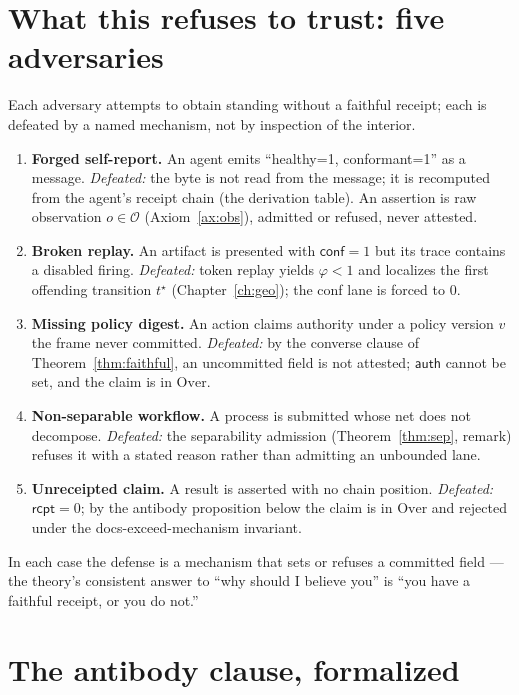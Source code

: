 \documentclass[11pt,oneside]{book}
\theoremstyle{definition}
\theoremstyle{plain}
\theoremstyle{remark}
\newcommand{\Obs}{\mathcal{O}}                 %
\newcommand{\Fitness}{\varphi}
\begin{document}
\section{What this refuses to trust: five adversaries}

Each adversary attempts to obtain standing without a faithful receipt; each is defeated by a
named mechanism, not by inspection of the interior.
\begin{enumerate}[leftmargin=1.6em,itemsep=2pt]
\item \textbf{Forged self-report.} An agent emits ``\textsf{healthy}=1, \textsf{conformant}=1''
      as a message. \emph{Defeated:} the byte is not read from the message; it is recomputed
      from the agent's receipt chain (the derivation table). An assertion is raw observation
      $o\in\Obs$ (Axiom~\ref{ax:obs}), admitted or refused, never attested.
\item \textbf{Broken replay.} An artifact is presented with $\textsf{conf}=1$ but its trace
      contains a disabled firing. \emph{Defeated:} token replay yields $\Fitness<1$ and
      localizes the first offending transition $t^\star$ (Chapter~\ref{ch:geo}); the
      \textsf{conf} lane is forced to $0$.
\item \textbf{Missing policy digest.} An action claims authority under a policy version $v$ the
      frame never committed. \emph{Defeated:} by the converse clause of
      Theorem~\ref{thm:faithful}, an uncommitted field is not attested; $\textsf{auth}$ cannot
      be set, and the claim is in $\mathrm{Over}$.
\item \textbf{Non-separable workflow.} A process is submitted whose net does not decompose.
      \emph{Defeated:} the separability admission (Theorem~\ref{thm:sep}, remark) refuses it
      with a stated reason rather than admitting an unbounded lane.
\item \textbf{Unreceipted claim.} A result is asserted with no chain position.
      \emph{Defeated:} $\textsf{rcpt}=0$; by the antibody proposition below the claim is in
      $\mathrm{Over}$ and rejected under the \textsf{docs-exceed-mechanism} invariant.
\end{enumerate}
In each case the defense is a mechanism that sets or refuses a committed field --- the theory's
consistent answer to ``why should I believe you'' is ``you have a faithful receipt, or you do
not.''

\section{The antibody clause, formalized}
\end{document}
